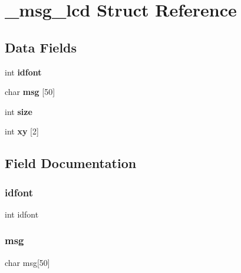 \hypertarget{struct__msg__lcd}{}\section{\+\_\+msg\+\_\+lcd Struct Reference}
\label{struct__msg__lcd}
\subsection*{Data Fields}
\begin{DoxyCompactItemize}
\item 
\hypertarget{struct__msg__lcd_a920bed898c8aa0c621de98b072beb7d7}{}\label{struct__msg__lcd_a920bed898c8aa0c621de98b072beb7d7} 
int {\bfseries idfont}
\item 
\hypertarget{struct__msg__lcd_ae4f3f55be5de649fd367081b9d1b4b0c}{}\label{struct__msg__lcd_ae4f3f55be5de649fd367081b9d1b4b0c} 
char {\bfseries msg} \mbox{[}50\mbox{]}
\item 
\hypertarget{struct__msg__lcd_a439227feff9d7f55384e8780cfc2eb82}{}\label{struct__msg__lcd_a439227feff9d7f55384e8780cfc2eb82} 
int {\bfseries size}
\item 
\hypertarget{struct__msg__lcd_a4e3cffd47e372183af356a20d713d7d4}{}\label{struct__msg__lcd_a4e3cffd47e372183af356a20d713d7d4} 
int {\bfseries xy} \mbox{[}2\mbox{]}
\end{DoxyCompactItemize}


\subsection{Field Documentation}
\hypertarget{struct__msg__lcd_a920bed898c8aa0c621de98b072beb7d7}{}\label{struct__msg__lcd_a920bed898c8aa0c621de98b072beb7d7} 
\subsubsection{\texorpdfstring{idfont}{idfont}}
{\footnotesize\ttfamily int idfont}

\hypertarget{struct__msg__lcd_ae4f3f55be5de649fd367081b9d1b4b0c}{}\label{struct__msg__lcd_ae4f3f55be5de649fd367081b9d1b4b0c} 
\subsubsection{\texorpdfstring{msg}{msg}}
{\footnotesize\ttfamily char msg\mbox{[}50\mbox{]}}

